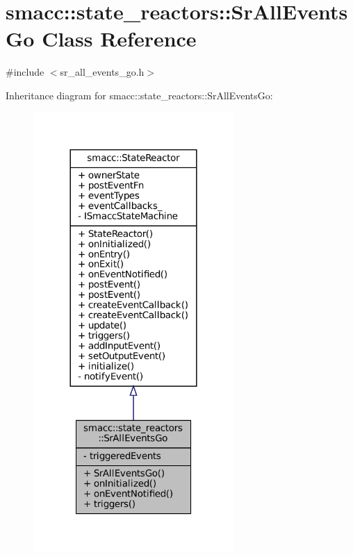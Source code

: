 \hypertarget{classsmacc_1_1state__reactors_1_1SrAllEventsGo}{}\section{smacc\+:\+:state\+\_\+reactors\+:\+:Sr\+All\+Events\+Go Class Reference}
\label{classsmacc_1_1state__reactors_1_1SrAllEventsGo}


{\ttfamily \#include $<$sr\+\_\+all\+\_\+events\+\_\+go.\+h$>$}



Inheritance diagram for smacc\+:\+:state\+\_\+reactors\+:\+:Sr\+All\+Events\+Go\+:
\nopagebreak
\begin{figure}[H]
\begin{center}
\leavevmode
\includegraphics[width=216pt]{classsmacc_1_1state__reactors_1_1SrAllEventsGo__inherit__graph}
\end{center}
\end{figure}


